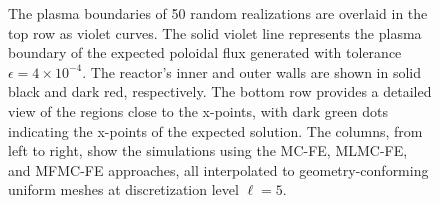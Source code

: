 \begin{figure}[ht!]\centering
{}
\caption{The plasma boundaries of 50 random realizations are overlaid in the top row as violet curves. The solid violet line represents the plasma boundary of the expected poloidal flux generated with tolerance $\epsilon=4\times 10^{-4}$. The reactor's inner and outer walls are shown in solid black and dark red, respectively. The bottom row provides a detailed view of the regions close to the x-points, with dark green dots indicating the x-points of the expected solution. The columns, from left to right, show the simulations using the MC-FE, MLMC-FE, and MFMC-FE approaches, all interpolated to geometry-conforming uniform meshes at discretization level $\ell=5$.}
\label{fig:QoI_plot}
\end{figure}












